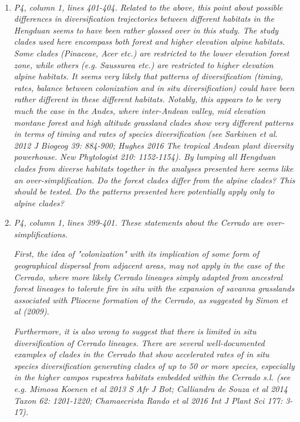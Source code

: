 \documentclass[12pt]{letter}
\begin{document}
\begin{letter}{ \\

}
\begin{enumerate}
\item \textit{P4, column 1, lines 401-404. Related to the above, this
    point about possible differences in diversification trajectories
    between different habitats in the Hengduan seems to have been
    rather glossed over in this study. The study clades used here
    encompass both forest and higher elevation alpine habitats. Some
    clades (Pinaceae, Acer etc.)  are restricted to the lower
    elevation forest zone, while others (e.g. Saussurea etc.) are
    restricted to higher elevation alpine habitats. It seems very
    likely that patterns of diversification (timing, rates, balance
    between colonization and in situ diversification) could have been
    rather different in these different habitats.  Notably, this
    appears to be very much the case in the Andes, where inter-Andean
    valley, mid elevation montane forest and high altitude grassland
    clades show very different patterns in terms of timing and rates
    of species diversification (see Sarkinen et al. 2012 J Biogeog 39:
    884-900; Hughes 2016 The tropical Andean plant diversity
    powerhouse. New Phytologist 210: 1152-1154). By lumping all
    Hengduan clades from diverse habitats together in the analyses
    presented here seems like an over-simplification. Do the forest
    clades differ from the alpine clades? This should be tested. Do
    the patterns presented here potentially apply only to alpine
    clades?}

\item \textit{P4, column 1, lines 399-401. These statements about the
    Cerrado are over-simplifications.}

  \textit{First, the idea of "colonization" with its implication of
    some form of geographical dispersal from adjacent areas, may not
    apply in the case of the Cerrado, where more likely Cerrado
    lineages simply adapted from ancestral forest lineages to tolerate
    fire in situ with the expansion of savanna grasslands associated
    with Pliocene formation of the Cerrado, as suggested by Simon et
    al (2009).}

  \textit{Furthermore, it is also wrong to suggest that there is
    limited in situ diversification of Cerrado lineages. There are
    several well-documented examples of clades in the Cerrado that
    show accelerated rates of in situ species diversification
    generating clades of up to 50 or more species, especially in the
    higher campos rupestres habitats embedded within the Cerrado
    s.l. (see e.g. Mimosa Koenen et al 2013 S Afr J Bot; Calliandra de
    Souza et al 2014 Taxon 62: 1201-1220; Chamaecrista Rando et al
    2016 Int J Plant Sci 177: 3-17).}


\end{enumerate}
\end{letter}
\end{document}
